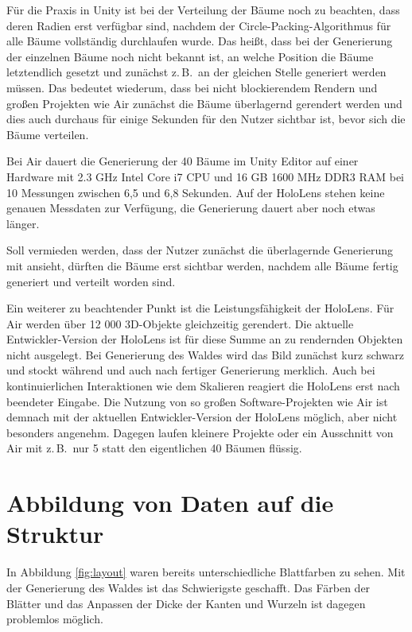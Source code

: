 Für die Praxis in Unity ist bei der Verteilung der Bäume noch zu beachten, dass deren Radien erst verfügbar sind, nachdem der Circle-Packing-Algorithmus für alle Bäume vollständig durchlaufen wurde. Das heißt, dass bei der Generierung der einzelnen Bäume noch nicht bekannt ist, an welche Position die Bäume letztendlich gesetzt und zunächst z.\,B.\ an der gleichen Stelle generiert werden müssen. Das bedeutet wiederum, dass bei nicht blockierendem Rendern und großen Projekten wie Air zunächst die Bäume überlagernd gerendert werden und dies auch durchaus für einige Sekunden für den Nutzer sichtbar ist, bevor sich die Bäume verteilen.

Bei Air dauert die Generierung der 40 Bäume im Unity Editor auf einer Hardware mit 2.3 GHz Intel Core i7 CPU und 16 GB 1600 MHz DDR3 RAM bei 10 Messungen zwischen 6,5 und 6,8 Sekunden. Auf der HoloLens stehen keine genauen Messdaten zur Verfügung, die Generierung dauert aber noch etwas länger.

Soll vermieden werden, dass der Nutzer zunächst die überlagernde Generierung mit ansieht, dürften die Bäume erst sichtbar werden, nachdem alle Bäume fertig generiert und verteilt worden sind.

Ein weiterer zu beachtender Punkt ist die Leistungsfähigkeit der HoloLens. Für Air werden über 12 000 3D-Objekte gleichzeitig gerendert. Die aktuelle Entwickler-Version der HoloLens ist für diese Summe an zu rendernden Objekten nicht ausgelegt. Bei Generierung des Waldes wird das Bild zunächst kurz schwarz und stockt während und auch nach fertiger Generierung merklich. Auch bei kontinuierlichen Interaktionen wie dem Skalieren reagiert die HoloLens erst nach beendeter Eingabe. Die Nutzung von so großen Software-Projekten wie Air ist demnach mit der aktuellen Entwickler-Version der HoloLens möglich, aber nicht besonders angenehm. Dagegen laufen kleinere Projekte oder ein Ausschnitt von Air mit z.\,B.\ nur 5 statt den eigentlichen 40 Bäumen flüssig.

\section{Abbildung von Daten auf die Struktur}
\label{sec:data}

In Abbildung \ref{fig:layout} waren bereits unterschiedliche Blattfarben zu sehen. Mit der Generierung des Waldes ist das Schwierigste geschafft. Das Färben der Blätter und das Anpassen der Dicke der Kanten und Wurzeln ist dagegen problemlos möglich.

